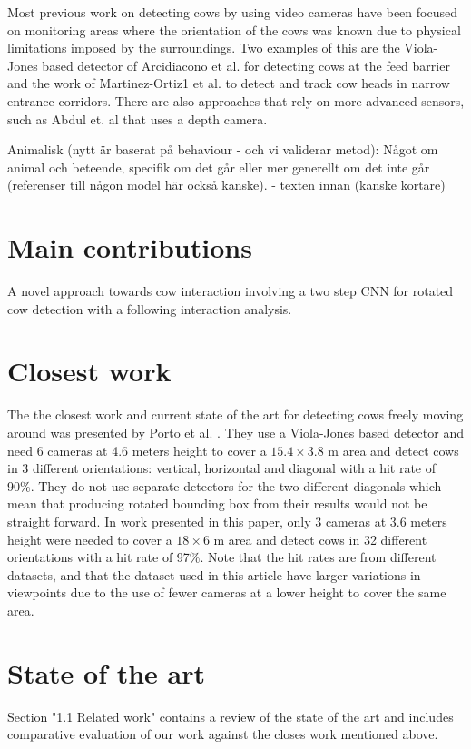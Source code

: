 \documentclass[10pt,a4paper]{article}
\begin{document}
Most previous work on detecting cows by using video cameras have been focused on monitoring areas where the orientation of the cows was known due to physical limitations imposed by the surroundings. Two examples of this are the Viola-Jones based detector of Arcidiacono et al. \cite{Arcidiacono2012} for detecting cows at the feed barrier and the work of Martinez-Ortiz1 et al. \cite{martinez2013video} to detect and track cow heads in narrow entrance corridors. There are also approaches that rely on more advanced sensors, such as Abdul et. al \cite{abdul2016locomotion} that uses a depth camera.

Animalisk (nytt är baserat på behaviour - och vi validerar metod):
Något om animal och beteende, specifik om det går eller mer generellt om det inte går (referenser till någon model här också kanske).
- texten innan (kanske kortare)


\section{Main contributions}
A novel approach towards cow interaction involving a two step CNN for rotated cow detection with a following interaction analysis.

\section{Closest work}
The the closest work and current state of the art for detecting cows freely moving around was presented by Porto et al. \cite{porto2015automatic}. They use a Viola-Jones based detector and need 
6 cameras at 4.6 meters height to cover a $15.4 \times 3.8$ m area and detect cows in 3 different orientations: vertical, horizontal and diagonal with a hit rate of 90\%. They do not use separate detectors for the two different diagonals which mean that producing rotated bounding box from their results would not be straight forward. In work presented in this paper, only 3 cameras at 3.6 meters height were needed to cover a $18 \times 6$ m area and detect cows in 32 different orientations with a hit rate of 97\%. Note that the hit rates are from different datasets, and that the dataset used in this article have larger variations in viewpoints due to the use of fewer cameras at a lower height to cover the same area.

\section{State of the art}
Section "1.1 Related work" contains a review of the state of the art and includes comparative evaluation of our work against the closes work mentioned above.
\end{document}
